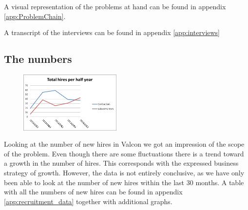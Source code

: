 A visual representation of the problems at hand can be found in appendix \ref{app:ProblemChain}.

A transcript of the interviews can be found in appendix \ref{app:interviews}

\subsection{The numbers}
\begin{figure}
\vspace{-20pt}
\centering
\includegraphics[width=0.45\textwidth]{appendix/total_hires_per_half_year.png}
\label{fig:total_hires_per_half_year}
\end{figure}
Looking at the number of new hires in Valcon we got an impression of the scope of the problem.
Even though there are some fluctuations there is a trend toward a growth in the number of hires.
This corresponds with the expressed business strategy of growth.
However, the data is not entirely conclusive, as we have only been able to look at the number of new hires within the last 30 months.
A table with all the numbers of new hires can be found in appendix \ref{app:recruitment_data} together with additional graphs.

